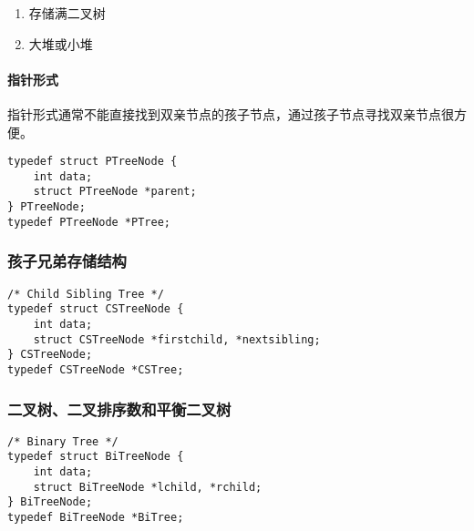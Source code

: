 \documentclass{ctexart}
\begin{document}
\begin{enumerate}
\begin{itemize}
            \item 判断两个元素是否同一集合 \texttt{bool Same(UFSet *set, int x, int y);}
                \begin{verbatim}
                bool Same(UFSet *set, int x, int y)
                {
                    int xparent = Find(set, x);
                    int yparent = Find(set, y);
                    if (-1 == xparent || -1 == yparent)
                        return false;
                    return (xparent == yparent);
                }
                \end{verbatim}

            \item 合并 \texttt{x} 和 \texttt{y} 所在的集合 \texttt{bool Union(UFSet *set, int x, int y);}
                下面单纯的合并算法会导致查找函数 \texttt{Find} 效率降低，实际中有两种方法优化：按秩合并和路径压缩的方法。优化方法具体实现请参见\footnote{\url{https://en.wikipedia.org/wiki/Disjoint-set_data_structure}}。
                \inputminted{c}{codes/ufset-union.c}

        \end{itemize}
    \item 存储满二叉树
    \item 大堆或小堆 %
\end{enumerate}

\paragraph{指针形式} 指针形式通常不能直接找到双亲节点的孩子节点，通过孩子节点寻找双亲节点很方便。
\begin{verbatim}
typedef struct PTreeNode {
    int data;
    struct PTreeNode *parent;
} PTreeNode;
typedef PTreeNode *PTree;
\end{verbatim}

\subsubsection{孩子兄弟存储结构}
\begin{verbatim}
/* Child Sibling Tree */
typedef struct CSTreeNode {
    int data;
    struct CSTreeNode *firstchild, *nextsibling;
} CSTreeNode;
typedef CSTreeNode *CSTree;
\end{verbatim}

\subsubsection{二叉树、二叉排序数和平衡二叉树}
\begin{verbatim}
/* Binary Tree */
typedef struct BiTreeNode {
    int data;
    struct BiTreeNode *lchild, *rchild;
} BiTreeNode;
typedef BiTreeNode *BiTree;
\end{verbatim}
\end{document}
